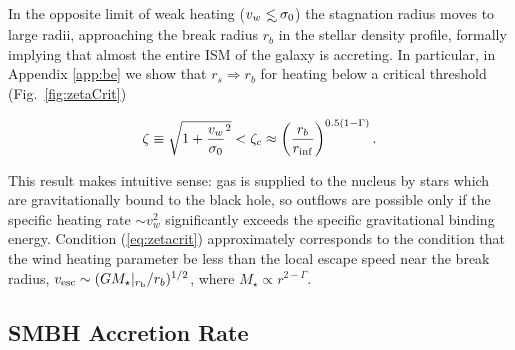 \documentclass[usenatbib,fleqn]{mn2e}
\newcommand\lsim{\mathrel{\rlap{\lower4pt\hbox{\hskip1pt$\sim$}}
    \raise1pt\hbox{$<$}}}
\newcommand{\rs}{r_s}
\newcommand{\rb}{r_b}
\newcommand{\rinf}{r_{\rm inf}}
\begin{document}
In the opposite limit of weak heating ($v_w\lsim \sigma_0$) the
stagnation radius moves to large radii, approaching the break radius
$\rb$ in the stellar density profile, formally implying that almost the
entire ISM of the galaxy is accreting.  In particular, in Appendix
\ref{app:be} we show that $\rs \Rightarrow \rb$ for heating below a
critical threshold (Fig.~\ref{fig:zetaCrit}) 

\begin{equation} 
\zeta\equiv \sqrt{1 + \frac{v_w}{\sigma_0}^2} <
\zeta_c \approx \left(\frac{\rb}{\rinf}\right)^{0.5(1-\Gamma)}.
\label{eq:zetacrit}
\end{equation}

This result makes intuitive sense: gas is supplied to the nucleus
by stars which are gravitationally bound to the black hole, so
outflows are possible only if the specific heating rate $\sim
v_{w}^{2}$ significantly exceeds the specific gravitational binding
energy.  Condition (\ref{eq:zetacrit}) approximately corresponds to
the condition that the wind heating parameter be less than the local escape
speed near the break radius, $v_{\rm esc} \sim (GM_{\star}|_{r_{\rm
    b}}/r_b)^{1/2}$, where $M_{\star} \propto r^{2-\Gamma}$.

\subsection{SMBH Accretion Rate}
\end{document}
